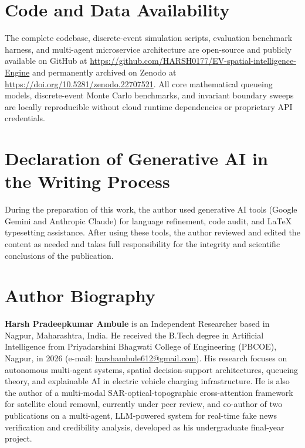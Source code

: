 \documentclass[preprint,12pt,authoryear]{elsarticle}
\begin{document}
\section*{Code and Data Availability}
The complete codebase, discrete-event simulation scripts, evaluation benchmark harness, and multi-agent microservice architecture are open-source and publicly available on GitHub at \url{https://github.com/HARSH0177/EV-spatial-intelligence-Engine} and permanently archived on Zenodo at \url{https://doi.org/10.5281/zenodo.22707521}. All core mathematical queueing models, discrete-event Monte Carlo benchmarks, and invariant boundary sweeps are locally reproducible without cloud runtime dependencies or proprietary API credentials.

\section*{Declaration of Generative AI in the Writing Process}
During the preparation of this work, the author used generative AI tools (Google Gemini and Anthropic Claude) for language refinement, code audit, and LaTeX typesetting assistance. After using these tools, the author reviewed and edited the content as needed and takes full responsibility for the integrity and scientific conclusions of the publication.

\section*{Author Biography}
\noindent\textbf{Harsh Pradeepkumar Ambule} is an Independent Researcher based in Nagpur, Maharashtra, India. He received the B.Tech degree in Artificial Intelligence from Priyadarshini Bhagwati College of Engineering (PBCOE), Nagpur, in 2026 (e-mail: \href{mailto:harshambule612@gmail.com}{harshambule612@gmail.com}). His research focuses on autonomous multi-agent systems, spatial decision-support architectures, queueing theory, and explainable AI in electric vehicle charging infrastructure. He is also the author of a multi-modal SAR-optical-topographic cross-attention framework for satellite cloud removal, currently under peer review, and co-author of two publications on a multi-agent, LLM-powered system for real-time fake news verification and credibility analysis, developed as his undergraduate final-year project.



\end{document}
